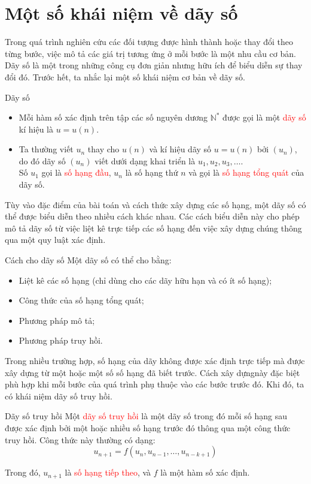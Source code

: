 \documentclass[12pt,a4paper,oneside]{book}
\theoremstyle{theorem}
\theoremstyle{definition}
\begin{document}
\section{Một số khái niệm về dãy số}
    \noindent Trong quá trình nghiên cứu các đối tượng được hình thành hoặc thay đổi theo từng bước, việc mô tả các giá trị tương ứng ở mỗi bước là một nhu cầu cơ bản. Dãy số là một trong những công cụ đơn giản nhưng hữu ích để biểu diễn sự thay đổi đó. Trước hết, ta nhắc lại một số khái niệm cơ bản về dãy số.
\begin{khung} {Dãy số}
    \begin{itemize}
    \item Mỗi hàm số xác định trên tập các số nguyên dương $\mathbb{N}^*$ được gọi là một \textcolor{red} {dãy số} kí hiệu là $u=u(n)$.

    \item Ta thường viết $u_n$ thay cho $u(n)$ và kí hiệu dãy số $u=u(n)$ bởi $(u_n)$, do đó dãy số $(u_n)$ viết dưới dạng khai triển là $u_1,u_2,u_3,\ldots$.\\
    Số $u_1$ gọi là \textcolor{red}{số hạng đầu}, $u_n$ là số hạng thứ $n$ và gọi là \textcolor{red}{số hạng tổng quát} của dãy số.
\end{itemize}
\end{khung}
   \noindent Tùy vào đặc điểm của bài toán và cách thức xây dựng các số hạng, một dãy số có thể được biểu diễn theo nhiều cách khác nhau. Các cách biểu diễn này cho phép mô tả dãy số từ việc liệt kê trực tiếp các số hạng đến việc xây dựng chúng thông qua một quy luật xác định.
    \begin{khung} {Cách cho dãy số}
    Một dãy số có thể cho bằng:   
    \begin{itemize}
        \item Liệt kê các số hạng (chỉ dùng cho các dãy hữu hạn và có ít số hạng);
        \item Công thức của số hạng tổng quát;
        \item Phương pháp mô tả;
        \item Phương pháp truy hồi.
    \end{itemize}
    \end{khung}
       \noindent Trong nhiều trường hợp, số hạng của dãy không được xác định trực tiếp mà được xây dựng từ một hoặc một số số hạng đã biết trước. Cách xây dựngnày đặc biệt phù hợp khi mỗi bước của quá trình phụ thuộc vào các bước trước đó. Khi đó, ta có khái niệm dãy số truy hồi.
        \begin{khung} {Dãy số truy hồi}
        Một \textcolor{red} {dãy số truy hồi} là một dãy số trong đó mỗi số hạng sau được xác định bởi một hoặc nhiều số hạng trước đó thông qua một công thức truy hồi. Công thức này thường có dạng:
        \[
        u_{n+1} = f(u_n, u_{n-1}, \dots, u_{n-k+1})
        \]
        
        Trong đó, $u_{n+1}$ là \textcolor{red} {số hạng tiếp theo}, và $f$ là một hàm số xác định.
    \end{khung}
\end{document}
